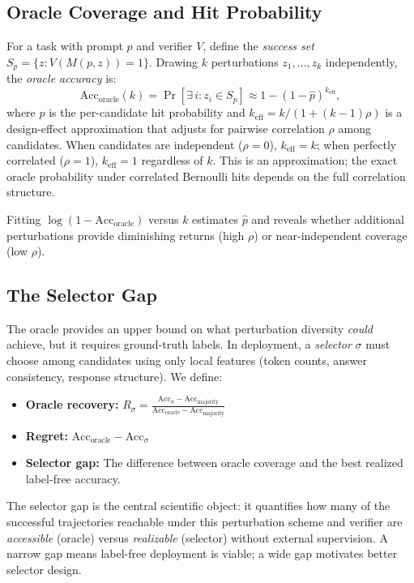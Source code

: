 \documentclass{article}
\begin{document}
\subsection{Oracle Coverage and Hit Probability}

For a task with prompt $p$ and verifier $V$, define the \emph{success
set} $S_p = \{z : V(M(p, z)) = 1\}$. Drawing $k$ perturbations
$z_1, \ldots, z_k$ independently, the \emph{oracle accuracy} is:
\[
\text{Acc}_{\text{oracle}}(k) = \Pr\!\left[\exists\, i : z_i \in S_p\right]
\approx 1 - (1 - \hat{p})^{k_{\text{eff}}},
\]
where $\hat{p}$ is the per-candidate hit probability and $k_{\text{eff}}
= k / (1 + (k-1)\rho)$ is a design-effect approximation that adjusts
for pairwise correlation $\rho$ among candidates. When candidates are
independent ($\rho = 0$), $k_{\text{eff}} = k$; when perfectly
correlated ($\rho = 1$), $k_{\text{eff}} = 1$ regardless of $k$.
This is an approximation; the exact oracle probability under correlated
Bernoulli hits depends on the full correlation structure.

Fitting $\log(1 - \text{Acc}_{\text{oracle}})$ versus $k$ estimates
$\hat{p}$ and reveals whether additional perturbations provide
diminishing returns (high $\rho$) or near-independent coverage
(low $\rho$).

\subsection{The Selector Gap}

The oracle provides an upper bound on what perturbation diversity
\emph{could} achieve, but it requires ground-truth labels. In
deployment, a \emph{selector} $\sigma$ must choose among candidates
using only local features (token counts, answer consistency, response
structure). We define:

\begin{itemize}
    \item \textbf{Oracle recovery:} $R_\sigma = \frac{\text{Acc}_\sigma - \text{Acc}_{\text{majority}}}{\text{Acc}_{\text{oracle}} - \text{Acc}_{\text{majority}}}$
    \item \textbf{Regret:} $\text{Acc}_{\text{oracle}} - \text{Acc}_\sigma$
    \item \textbf{Selector gap:} The difference between oracle coverage and the best realized label-free accuracy.
\end{itemize}

The selector gap is the central scientific object: it quantifies how
many of the successful trajectories reachable under this perturbation
scheme and verifier are \emph{accessible} (oracle) versus
\emph{realizable} (selector) without external supervision. A narrow
gap means label-free deployment is viable; a wide gap motivates better
selector design.
\end{document}
